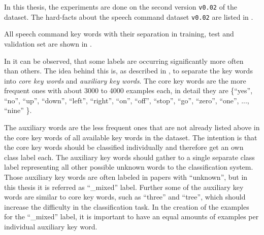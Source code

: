 In this thesis, the experiments are done on the second version \texttt{v0.02} of the dataset.
The hard-facts about the speech command dataset \texttt{v0.02} are listed in .

All speech command key words with their separation in training, test and validation set are shown in .

In  it can be observed, that some labels are occurring significantly more often than others.
The idea behind this is, as described in \cite{Warden2018}, to separate the key words into \emph{core key words} and \emph{auxiliary key words}.
The core key words are the more frequent ones with about 3000 to 4000 examples each, in detail they are \{\enquote{yes}, \enquote{no}, \enquote{up}, \enquote{down}, \enquote{left}, \enquote{right}, \enquote{on}, \enquote{off}, \enquote{stop}, \enquote{go}, \enquote{zero}, \enquote{one}, ..., \enquote{nine} \}.

The auxiliary words are the less frequent ones that are not already listed above in the core key words of all available key words in the dataset.
The intention is that the core key words should be classified individually and therefore get an own class label each. 
The auxiliary key words should gather to a single separate class label representing all other possible unknown words to the classification system.
Those auxiliary key words are often labeled in papers with \enquote{unknown}, but in this thesis it is referred as \enquote{\_mixed} label.
Further some of the auxiliary key words are similar to core key words, such as \enquote{three} and \enquote{tree}, which should increase the difficulty in the classification task. 
In the creation of the examples for the \enquote{\_mixed} label, it is important to have an equal amounts of examples per individual auxiliary key word.


